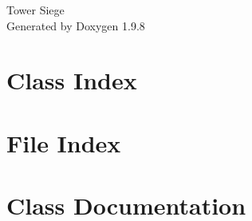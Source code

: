 \documentclass[twoside]{book}
\newcommand{\+}{\discretionary{\mbox{\scriptsize$\hookleftarrow$}}{}{}}
\newcommand{\clearemptydoublepage}{%
    \newpage{\pagestyle{empty}\cleardoublepage}%
  }
\begin{document}
  \raggedbottom
    \hypersetup{pageanchor=false,
                bookmarksnumbered=true,
                pdfencoding=unicode
               }
  \begin{titlepage}
  \vspace*{7cm}
  \begin{center}%
  {\Large Tower Siege}\\
  \vspace*{1cm}
  {\large Generated by Doxygen 1.9.8}\\
  \end{center}
  \end{titlepage}
  \clearemptydoublepage
  \tableofcontents
  \clearemptydoublepage
  \hypersetup{pageanchor=true}

\chapter{Class Index}

\chapter{File Index}

\chapter{Class Documentation}







\end{document}
